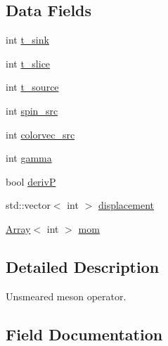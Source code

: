 \subsection*{Data Fields}
\begin{DoxyCompactItemize}
\item 
int \mbox{\hyperlink{structHadron_1_1KeyUnsmearedMesonElementalOperator__t_ab8ad223c7fbf85503f61bc76a3e4776a}{t\+\_\+sink}}
\item 
int \mbox{\hyperlink{structHadron_1_1KeyUnsmearedMesonElementalOperator__t_ab1dad327f8aa5096c593e4c9d0662a7d}{t\+\_\+slice}}
\item 
int \mbox{\hyperlink{structHadron_1_1KeyUnsmearedMesonElementalOperator__t_a832a42e8cf448bcaaeb24f8e12ea67ee}{t\+\_\+source}}
\item 
int \mbox{\hyperlink{structHadron_1_1KeyUnsmearedMesonElementalOperator__t_acd5e3224b89c68b7e3148c6382afc3a2}{spin\+\_\+src}}
\item 
int \mbox{\hyperlink{structHadron_1_1KeyUnsmearedMesonElementalOperator__t_a3f855944e4f518791d562bafc37c8079}{colorvec\+\_\+src}}
\item 
int \mbox{\hyperlink{structHadron_1_1KeyUnsmearedMesonElementalOperator__t_a019eb338156c357aa6e858c87e48d155}{gamma}}
\item 
bool \mbox{\hyperlink{structHadron_1_1KeyUnsmearedMesonElementalOperator__t_ab87d732410105c7876a6c915de0e6c2f}{derivP}}
\item 
std\+::vector$<$ int $>$ \mbox{\hyperlink{structHadron_1_1KeyUnsmearedMesonElementalOperator__t_af898c57092186a18d10186659e011bf2}{displacement}}
\item 
\mbox{\hyperlink{classXMLArray_1_1Array}{Array}}$<$ int $>$ \mbox{\hyperlink{structHadron_1_1KeyUnsmearedMesonElementalOperator__t_a1fd40a8ad7064170f1515071a4f399d2}{mom}}
\end{DoxyCompactItemize}


\subsection{Detailed Description}
Unsmeared meson operator. 

\subsection{Field Documentation}
\mbox{\label{structHadron_1_1KeyUnsmearedMesonElementalOperator__t_a3f855944e4f518791d562bafc37c8079}} 
